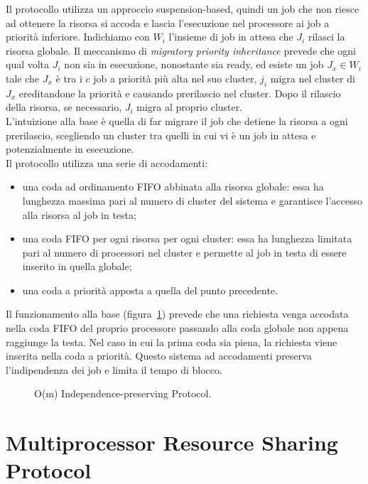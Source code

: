Il protocollo utilizza un approccio suspension-based, quindi un job che non riesce ad ottenere la risorsa si accoda e lascia l’esecuzione nel processore ai job a priorità inferiore. Indichiamo con $W_i$ l'insieme di job in attesa che $J_i$ rilasci la risorsa globale. Il meccanismo di \textit{migratory priority inheritance} prevede che ogni qual volta $J_i$ non sia in esecuzione, nonostante sia ready, ed esiste un job $J_x \in W_i$ tale che $J_x$ è tra i $c$ job a priorità più alta nel suo cluster, $j_i$ migra nel cluster di $J_x$ ereditandone la priorità e causando prerilascio nel cluster. Dopo il rilascio della risorsa, se necessario, $J_i$ migra al proprio cluster.\\
L'intuizione alla base è quella di far migrare il job che detiene la risorsa a ogni prerilascio, scegliendo un cluster tra quelli in cui vi è un job in attesa e potenzialmente in esecuzione.\\

Il protocollo utilizza una serie di accodamenti:

\begin{itemize}
\item una coda ad ordinamento FIFO abbinata alla risorsa globale: essa ha lunghezza massima pari al numero di cluster del sistema e garantisce l'accesso alla risorsa al job in testa;
\item una coda FIFO per ogni risorsa per ogni cluster: essa ha lunghezza limitata pari al numero di processori nel cluster e permette al job in testa di essere inserito in quella globale;
\item una coda a priorità apposta a quella del punto precedente.
\end{itemize}

Il funzionamento alla base (figura~\ref{fig:locks.omip}) prevede che una richiesta venga accodata nella coda FIFO del proprio processore passando alla coda globale non appena raggiunge la testa. Nel caso in cui la prima coda sia piena, la richiesta viene inserita nella coda a priorità. Questo sistema ad accodamenti preserva l'indipendenza dei job e limita il tempo di blocco.

\begin{figure}
\centering
{}
\caption{O(m) Independence-preserving Protocol.}
\label{fig:locks.omip}
\end{figure}

\section{Multiprocessor Resource Sharing Protocol}
\label{sec:lockProtocols.mrsp}

